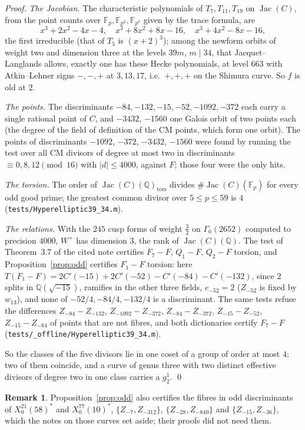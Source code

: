 \documentclass[11pt,reqno]{amsart}
\theoremstyle{plain}
\theoremstyle{definition}
\newtheorem{remark}[theorem]{Remark}
\DeclareMathOperator{\Jac}{Jac}
\newcommand{\Q}{\mathbb{Q}}
\newcommand{\F}{\mathbb{F}}
\begin{document}
\begin{proof}
\emph{The Jacobian.} The characteristic polynomials of $T_7,T_{11},T_{19}$ on $\Jac(C)$, from the
point counts over $\F_p,\F_{p^2},\F_{p^3}$ given by the trace formula, are
\[
x^3+2x^2-4x-4,\quad x^3+8x^2+8x-16,\quad x^3+4x^2-8x-16,
\]
the first irreducible (that of $T_5$ is $(x+2)^3$); among the newform orbits of weight two and
dimension three at the levels $39m$, $m\mid34$, that Jacquet--Langlands allows, exactly one has
these Hecke polynomials, at level $663$ with Atkin--Lehner signs $-,-,+$ at $3,13,17$, i.e.\ $+,+,+$
on the Shimura curve. So $f$ is old at $2$.

\emph{The points.} The discriminants $-84,-132,-15,-52,-1092,-372$ each carry a single rational
point of $C$, and $-3432$, $-1560$ one Galois orbit of two points each (the degree of the field of
definition of the CM points, which form one orbit). The points of discriminants $-1092$, $-372$,
$-3432$, $-1560$ were found by running the test over all CM divisors of degree at most two in
discriminants $\equiv0,8,12\pmod{16}$ with $|d|\le4000$, against $F$; those four were the only hits.

\emph{The torsion.} The order of $\Jac(C)(\Q)_{\mathrm{tors}}$ divides $\#\Jac(C)(\F_p)$ for every
odd good prime; the greatest common divisor over $5\le p\le59$ is $4$ (\texttt{tests/Hyperelliptic39\_34.m}).

\emph{The relations.} With the $245$ cusp forms of weight $\tfrac32$ on $\Gamma_0(2652)$ computed to
precision $4000$, $W^+$ has dimension $3$, the rank of $\Jac(C)(\Q)$. The test of Theorem~3.7 of the
cited note certifies $F_7-F$, $Q_1-F$, $Q_2-F$ torsion, and Proposition~\ref{prop:odd} certifies
$F_1-F$ torsion: here $T(F_1-F)=2C'(-15)+2C'(-52)-C'(-84)-C'(-132)$, since $2$ splits in
$\Q(\sqrt{-15})$, ramifies in the other three fields, $e_{-52}=2$ ($Z_{-52}$ is fixed by $w_{13}$),
and none of $-52/4,-84/4,-132/4$ is a discriminant. The same tests refuse the differences
$Z_{-84}-Z_{-132}$, $Z_{-1092}-Z_{-372}$, $Z_{-84}-Z_{-372}$, $Z_{-15}-Z_{-52}$, $Z_{-15}-Z_{-84}$ of
points that are not fibres, and both dictionaries certify $F_7-F$
(\texttt{tests/\_offline/Hyperelliptic39\_34.m}).

So the classes of the five divisors lie in one coset of a group of order at most $4$; two of them
coincide, and a curve of genus three with two distinct effective divisors of degree two in one
class carries a $g^1_2$. \qed
\end{proof}

\begin{remark}
Proposition~\ref{prop:odd} also certifies the fibres in odd discriminants of $X_0^{21}(58)^*$ and
$X_0^{77}(10)^*$, $\{Z_{-7},Z_{-312}\}$, $\{Z_{-28},Z_{-840}\}$ and $\{Z_{-15},Z_{-36}\}$, which
the notes on those curves set aside; their proofs did not need them.
\end{remark}
\end{document}
